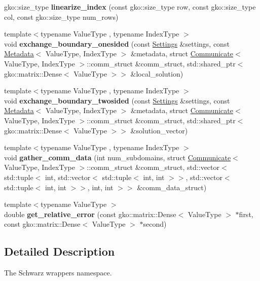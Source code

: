 \begin{DoxyCompactItemize}
\item 
\mbox{\label{namespaceSchwarzWrappers_a04eec9c45e6c8892a1f58f6e63bdb49e}} 
gko\+::size\+\_\+type {\bfseries linearize\+\_\+index} (const gko\+::size\+\_\+type row, const gko\+::size\+\_\+type col, const gko\+::size\+\_\+type num\+\_\+rows)
\item 
\mbox{\label{namespaceSchwarzWrappers_a641984e68102b3e16d20c78b94f5b92d}} 
{\footnotesize template$<$typename Value\+Type , typename Index\+Type $>$ }\\void {\bfseries exchange\+\_\+boundary\+\_\+onesided} (const \hyperlink{structSchwarzWrappers_1_1Settings}{Settings} \&settings, const \hyperlink{structSchwarzWrappers_1_1Metadata}{Metadata}$<$ Value\+Type, Index\+Type $>$ \&metadata, struct \hyperlink{classSchwarzWrappers_1_1Communicate}{Communicate}$<$ Value\+Type, Index\+Type $>$\+::comm\+\_\+struct \&comm\+\_\+struct, std\+::shared\+\_\+ptr$<$ gko\+::matrix\+::\+Dense$<$ Value\+Type $>$$>$ \&local\+\_\+solution)
\item 
\mbox{\label{namespaceSchwarzWrappers_ac82621175e8aa5923f753c0a31ea3a0e}} 
{\footnotesize template$<$typename Value\+Type , typename Index\+Type $>$ }\\void {\bfseries exchange\+\_\+boundary\+\_\+twosided} (const \hyperlink{structSchwarzWrappers_1_1Settings}{Settings} \&settings, const \hyperlink{structSchwarzWrappers_1_1Metadata}{Metadata}$<$ Value\+Type, Index\+Type $>$ \&metadata, struct \hyperlink{classSchwarzWrappers_1_1Communicate}{Communicate}$<$ Value\+Type, Index\+Type $>$\+::comm\+\_\+struct \&comm\+\_\+struct, std\+::shared\+\_\+ptr$<$ gko\+::matrix\+::\+Dense$<$ Value\+Type $>$$>$ \&solution\+\_\+vector)
\item 
\mbox{\label{namespaceSchwarzWrappers_ac3ea813e7def5dd435b215ff2a2dadaa}} 
{\footnotesize template$<$typename Value\+Type , typename Index\+Type $>$ }\\void {\bfseries gather\+\_\+comm\+\_\+data} (int num\+\_\+subdomains, struct \hyperlink{classSchwarzWrappers_1_1Communicate}{Communicate}$<$ Value\+Type, Index\+Type $>$\+::comm\+\_\+struct \&comm\+\_\+struct, std\+::vector$<$ std\+::tuple$<$ int, std\+::vector$<$ std\+::tuple$<$ int, int $>$$>$, std\+::vector$<$ std\+::tuple$<$ int, int $>$$>$, int, int $>$$>$ \&comm\+\_\+data\+\_\+struct)
\item 
\mbox{\label{namespaceSchwarzWrappers_ab81c8639ed0a4e60b442ccfc546de5e2}} 
{\footnotesize template$<$typename Value\+Type $>$ }\\double {\bfseries get\+\_\+relative\+\_\+error} (const gko\+::matrix\+::\+Dense$<$ Value\+Type $>$ $\ast$first, const gko\+::matrix\+::\+Dense$<$ Value\+Type $>$ $\ast$second)
\end{DoxyCompactItemize}


\subsection{Detailed Description}
The Schwarz wrappers namespace. 